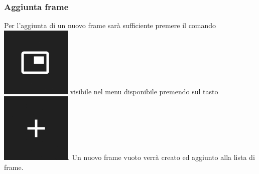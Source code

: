 \subsubsection{Aggiunta frame}
Per l'aggiunta di un nuovo frame sarà sufficiente premere il comando \includegraphics[scale=0.4]{img/add_frame.png} visibile nel menu disponibile premendo sul tasto \includegraphics[scale=0.4]{img/add_object.png}. Un nuovo frame vuoto verrà creato ed aggiunto alla lista di frame.

